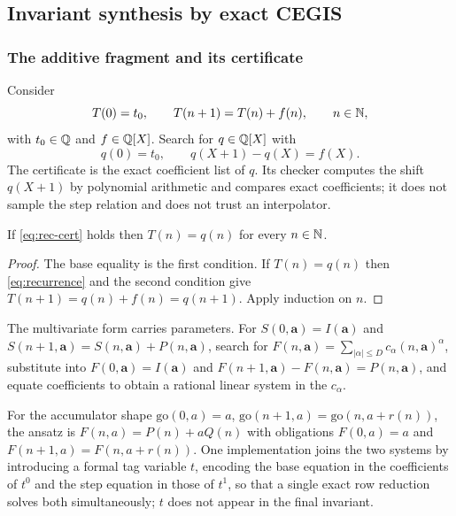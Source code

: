 \subsection{Invariant synthesis by exact CEGIS}

\subsubsection*{The additive fragment and its certificate}

Consider
\begin{equation}\label{eq:recurrence}
T(0)=t_0,\qquad T(n+1)=T(n)+f(n),\qquad n\in\mathbb{N},
\end{equation}
with $t_0\in\mathbb{Q}$ and $f\in\mathbb{Q}[X]$. Search for $q\in\mathbb{Q}[X]$ with
\begin{equation}\label{eq:rec-cert}
q(0)=t_0,\qquad q(X+1)-q(X)=f(X).
\end{equation}
The certificate is the exact coefficient list of $q$. Its checker computes the
shift $q(X+1)$ by polynomial arithmetic and compares exact coefficients; it does
not sample the step relation and does not trust an interpolator.

\begin{proposition}
\label{prop:rec}
If \eqref{eq:rec-cert} holds then $T(n)=q(n)$ for every $n\in\mathbb{N}$.
\end{proposition}
\begin{proof}
The base equality is the first condition. If $T(n)=q(n)$ then
\eqref{eq:recurrence} and the second condition give
$T(n+1)=q(n)+f(n)=q(n+1)$. Apply induction on $n$.
\end{proof}

The multivariate form carries parameters. For
$S(0,\bm a)=I(\bm a)$ and $S(n+1,\bm a)=S(n,\bm a)+P(n,\bm a)$, search for
$F(n,\bm a)=\sum_{|\alpha|\le D}c_\alpha(n,\bm a)^\alpha$, substitute into
$F(0,\bm a)=I(\bm a)$ and $F(n+1,\bm a)-F(n,\bm a)=P(n,\bm a)$, and equate
coefficients to obtain a rational linear system in the $c_\alpha$.

For the accumulator shape
$\mathrm{go}(0,a)=a$, $\mathrm{go}(n+1,a)=\mathrm{go}(n,a+r(n))$, the ansatz is
$F(n,a)=P(n)+aQ(n)$ with obligations $F(0,a)=a$ and $F(n+1,a)=F(n,a+r(n))$.
One implementation joins the two systems by introducing a formal tag variable
$t$, encoding the base equation in the coefficients of $t^0$ and the step
equation in those of $t^1$, so that a single exact row reduction solves both
simultaneously; $t$ does not appear in the final invariant.

